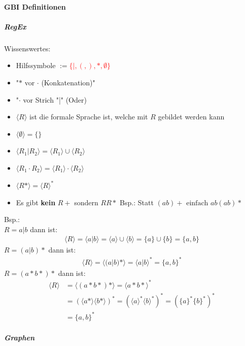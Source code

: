 \documentclass[12pt]{article}
\begin{document}
\paragraph{\Large GBI Definitionen}
\large\subparagraph{\large RegEx}
\normalsize
\begin{flushleft}
    Wissenswertes:
    \begin{itemize}
        \item Hilfssymbole $:=$\textcolor{red}{$\{|,(,),\ast,\emptyset\}$}
        \item "$\ast$ vor $\cdot$ (Konkatenation)"
        \item "$\cdot$ vor Strich "|" (Oder)
        \item $\langle R \rangle$ ist die formale Sprache ist, welche mit $R$ gebildet werden kann
        \item $\langle \emptyset \rangle = \{\}$
        \item $\langle R_1| R_2 \rangle = \langle R_1 \rangle \cup \langle R_2 \rangle$
        \item $\langle R_1 \cdot R_2 \rangle =\langle R_1 \rangle \cdot \langle R_2 \rangle$
        \item $\langle R \ast \rangle = \langle R \rangle ^\ast$
        \item Es gibt \textbf{kein} $R+$ sondern $RR\ast$ Bsp.: Statt $(ab)+ \text{ einfach } ab(ab)\ast$
    \end{itemize}
    Bsp.: \\
    $R = a|b$ dann ist:
    \begin{align*}
        \langle R \rangle = \langle a | b \rangle = \langle a \rangle \cup \langle b \rangle = \{a\} \cup \{b\} = \{a,b\}
    \end{align*}
    $R = (a|b)\ast$ dann ist:
    \begin{align*}
        \langle R \rangle = \langle (a|b)\ast \rangle = \langle a | b \rangle^\ast = \{a,b\}^\ast
    \end{align*}
    $R = (a\ast b\ast)\ast$ dann ist:
    \begin{align*}
        \langle R \rangle &= \langle (a\ast b\ast)\ast \rangle = \langle a\ast b\ast\rangle^\ast \\
        &= (\langle a\ast\rangle\langle b\ast\rangle)^\ast = (\langle a\rangle^\ast\langle b\rangle^\ast)^\ast = (\{a\}^\ast\{b\}^\ast)^\ast \\
        &= \{a,b\}^\ast
    \end{align*}
\end{flushleft}
\large\subparagraph{\large Graphen}
\end{document}
